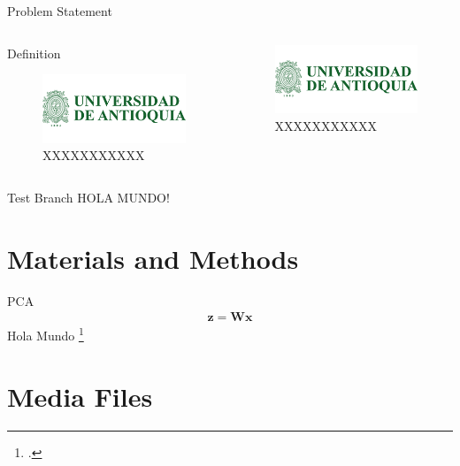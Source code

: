 \documentclass{beamer}
\begin{document}
\begin{frame}{Problem Statement}
\begin{columns}
	\begin{column}{0.45\linewidth}
		\begin{block}{Definition}
			\begin{figure}
				\includegraphics[width=0.5\linewidth]{logos/logoUdeA}
				\caption{XXXXXXXXXXX}
			\end{figure}
		\end{block}
	\end{column}
	\begin{column}{0.45\linewidth}
		\begin{figure}
			\includegraphics[width=0.5\linewidth]{logos/logoUdeA}
			\caption{XXXXXXXXXXX}
		\end{figure}
	\end{column}
\end{columns}

\end{frame}

\begin{frame}{Test Branch}
HOLA MUNDO! \citeauthor{Rasmunssen05}
\end{frame}
	
	\section{Materials and Methods}
	
	\begin{frame}{PCA}
	\begin{align}
	\mathbf{z} = \mathbf{W}\mathbf{x} 
	\end{align}
	Hola Mundo \footcite{Rasmunssen05}
\end{frame}

\section{Media Files}
\end{document}
